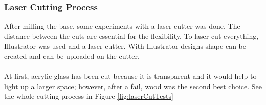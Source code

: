 \documentclass[04.3_buildingProcess.tex]{subfiles}
\begin{document}
    \subsubsection{Laser Cutting Process}
    \begin{flushleft}
        \noindent
        After milling the base, some experiments with a laser cutter was done. The distance between the
        cuts are essential for the flexibility. To laser cut everything, Illustrator\cite{illustrator} was used
        and a laser cutter. With Illustrator designs shape can be created and can be uploaded on the cutter. \\~\\

        \noindent
        At first, acrylic glass has been cut because it is transparent and it would help to light up 
        a larger space; however, after a fail, wood was the second best choice. See the whole cutting process 
        in Figure \ref{fig:laserCutTests}


\end{flushleft}
\end{document}
